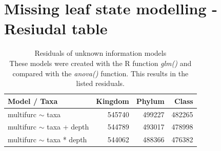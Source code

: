   \section{Missing leaf state modelling - Resiudal table}\label{sec:Residuals unknown information}
    \begin{table}[h!]
      \begin{center}
        \begin{tabular}{ |l|r|r|r| }
          \hline
          \bfseries Model / Taxa & \bfseries Kingdom & \bfseries Phylum & \bfseries Class \\
          \hline \hline
          multifurc $\sim$ taxa & 545740 & \cellcolor{green!10}499227 & \cellcolor{green!30}482265 \\
          \hline
          multifurc $\sim$ taxa + depth & 544789 & \cellcolor{green!10}493017 & \cellcolor{green!50}478998 \\
          \hline
          multifurc $\sim$ taxa * depth & 544062 & \cellcolor{green!30}488366 & \cellcolor{green!50}476382 \\
          \hline
        \end{tabular}
      \end{center}
      \caption{Residuals of unknown information models \\
        These models were created with the R function \textit{glm()} and compared with the 
          \textit{anova()} function. This results in the listed residuals.}
    \end{table}

